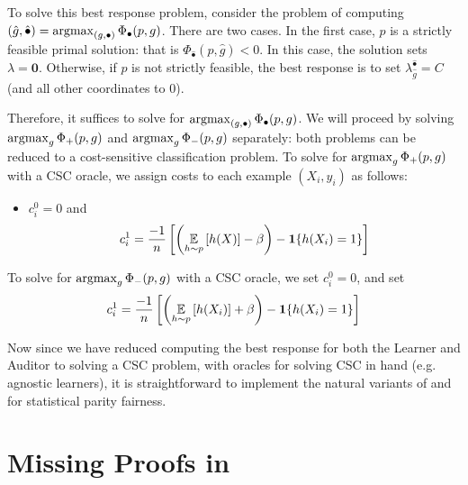 To solve this best response problem, consider the problem of computing
$(\hat g, \hat \bullet) = \operatorname*{\mathrm{argmax}}_{(g, \bullet)}\Phi_\bullet(p, g)$.
There are two cases. In the first case, $p$ is a strictly feasible primal
solution: that is $\Phi_{\hat \bullet} (p, \hat g) < 0$. In this case, the
solution sets $\lambda =
\mathbf{0}$. Otherwise, if $p$ is not strictly feasible, the best response is to set
$\lambda_{\hat g}^{\hat \bullet} = C$ (and all other coordinates to 0).

Therefore, it suffices to solve for
$\operatorname*{\mathrm{argmax}}_{(g, \bullet)}\Phi_\bullet(p, g)$. We will proceed by solving
$\operatorname*{\mathrm{argmax}}_{g} \Phi_+(p, g)$ and $\operatorname*{\mathrm{argmax}}_{g} \Phi_-(p, g)$ separately:
 both problems can be reduced to a cost-sensitive classification
problem. To solve for $\operatorname*{\mathrm{argmax}}_{g} \Phi_+(p, g)$ with a CSC oracle, we
assign costs to each example $(X_i, y_i)$ as follows:
\begin{itemize}
\item  $c_i^0 = 0$ and
  \begin{align}
    c_i^1 = \frac{-1}{n}\left[ \left(\operatorname*{\mathbb{E}}_{h\sim p}\left[h(X)\right] - \beta\right) - \textbf{1}\{h(X_i) = 1\}  \right]
  \end{align}
\end{itemize}

To solve for $\operatorname*{\mathrm{argmax}}_{g} \Phi_-(p, g)$ with a CSC oracle, we set $c_i^0 = 0$, and set
\[
  c_i^1 = \frac{-1}{n}\left[ \left(\operatorname*{\mathbb{E}}_{h\sim p}\left[h(X_i)\right] + \beta \right) - \textbf{1}\{h(X_i) = 1\}\right]
\]

Now since we have reduced computing the best response for both the
Learner and Auditor to solving a CSC problem, with oracles for solving
CSC in hand (e.g. agnostic learners), it is straightforward to implement the natural variants of  and  for statistical parity fairness.
\fi



\section{Missing Proofs in }

\approxmm*

